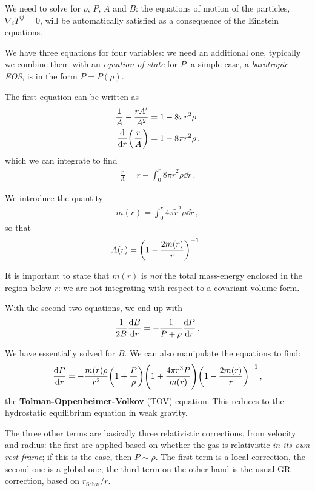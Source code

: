 \documentclass[main.tex]{subfiles}
\begin{document}
We need to solve for \(\rho \), \(P\), \(A\) and \(B\): the equations of motion of the particles, \(\nabla_{i} T^{ij} = 0\), will be automatically satisfied as a consequence of the Einstein equations. 

We have three equations for four variables: we need an additional one, typically we combine them with an \emph{equation of state} for \(P\): a simple case, a \emph{barotropic EOS}, is in the form \(P = P(\rho )\).

The first equation can be written as 
%
\begin{align}
\frac{1}{A} - \frac{r A'}{A^2} &= 1 - 8 \pi r^2 \rho  \\
\dv{}{r} \qty( \frac{r}{A}) &= 1 - 8 \pi r^2 \rho 
\,,
\end{align}
%
which we can integrate to find 
%
\begin{align}
\frac{r}{A} = r - \int_{0}^{r} 8 \pi \widetilde{r}^2\rho \dd{\widetilde{r}}
\,.
\end{align}

We introduce the quantity 
%
\begin{align}
m(r) = \int_{0}^{r} 4 \pi \widetilde{r}^2 \rho \dd{\widetilde{r}}
\,,
\end{align}
%
so that
%
\begin{align}
A(r) = \qty(1 - \frac{2 m(r)}{r})^{-1}
\,.
\end{align}

It is important to state that \(m(r)\) is \emph{not} the total mass-energy enclosed in the region below \(r\): we are not integrating with respect to a covariant volume form.

With the second two equations, we end up with 
%
\begin{align}
\frac{1}{2B} \dv{B}{r} = - \frac{1}{P + \rho } \dv{P}{r}
\,.
\end{align}

We have essentially solved for \(B\). 
We can also manipulate the equations to find:
%
\begin{align}
\dv{P}{r} = - \frac{m(r) \rho }{r^2} \qty(1 + \frac{P}{\rho })
\qty(1 + \frac{4 \pi r^3 P}{m(r)}) \qty(1 - \frac{2 m(r)}{r})^{-1}
\,,
\end{align}
%
the \textbf{Tolman-Oppenheimer-Volkov} (TOV) equation. 
This reduces to the hydrostatic equilibrium equation in weak gravity.

The three other terms are basically three relativistic corrections, from velocity and radius: the first are applied based on whether the gas is relativistic \emph{in its own rest frame}; if this is the case, then \(P \sim \rho \).
The first term is a local correction, the second one is a global one; the third term on the other hand is the usual GR correction, based on \(r _{\text{Schw}} / r\). 
\end{document}
